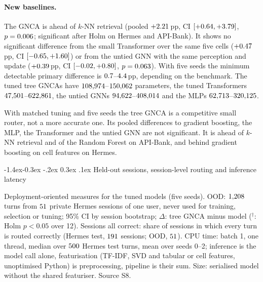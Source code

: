 \documentclass[10pt,twocolumn,letterpaper]{article}
\makeatletter
\renewcommand\subsection{\@startsection{subsection}{2}{\z@}%
  {-1.4ex\@plus -0.3ex \@minus -.2ex}%
  {0.3ex \@plus .1ex}%
  {\normalfont\normalsize\bfseries}}
\makeatother
\begin{document}
\paragraph{New baselines.} The GNCA is ahead of $k$-NN retrieval (pooled $+2.21$\,pp, CI $[+0.64, +3.79]$, $p=0.006$; significant after Holm on Hermes and API-Bank). It shows no significant difference from the small Transformer over the same five cells ($+0.47$\,pp, CI $[-0.65, +1.60]$) or from the untied GNN with the same perception and update ($+0.39$\,pp, CI $[-0.02, +0.80]$, $p=0.063$). With five seeds the minimum detectable primary difference is $0.7$--$4.4$\,pp, depending on the benchmark. The tuned tree GNCAs have $108{,}974$--$150{,}062$ parameters, the tuned Transformers $47{,}501$--$622{,}861$, the untied GNNs $94{,}622$--$408{,}014$ and the MLPs $62{,}713$--$320{,}125$.

With matched tuning and five seeds the tree GNCA is a competitive small router, not a more accurate one. Its pooled differences to gradient boosting, the MLP, the Transformer and the untied GNN are not significant. It is ahead of $k$-NN retrieval and of the Random Forest on API-Bank, and behind gradient boosting on cell features on Hermes.

\subsection{Held-out sessions, session-level routing and inference latency}\label{sec:deploy}
\begin{table}[t]
\centering
\scriptsize
\caption{Deployment-oriented measures for the tuned models (five seeds). OOD: $\numROodN$ turns from $\numROodSess$ private Hermes sessions of one user, never used for training, selection or tuning; 95\% CI by session bootstrap; $\Delta$: tree GNCA minus model ($^{\dagger}$: Holm $p<0.05$ over 12). Sessions all correct: share of sessions in which every turn is routed correctly (Hermes test, $\numRSesHerN$ sessions; OOD, $\numROodSess$). CPU time: batch 1, one thread, median over $\numRLatN$ Hermes test turns, mean over seeds 0--2; inference is the model call alone, featurisation (TF-IDF, SVD and tabular or cell features, unoptimised Python) is preprocessing, pipeline is their sum. Size: serialised model without the shared featuriser. Source S8.}
\label{tab:rig-deploy}

\end{table}
\end{document}
